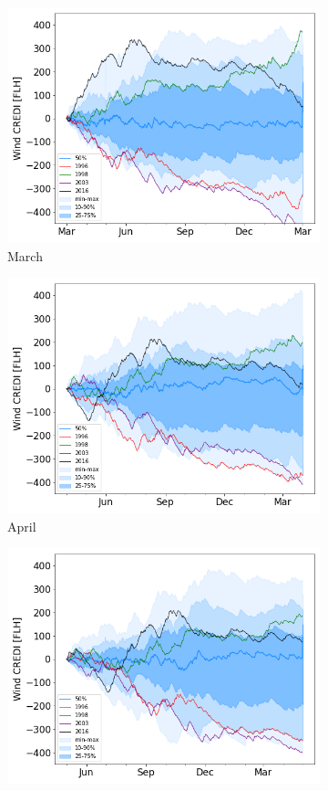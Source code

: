 \documentclass[a4paper,11pt]{extarticle}
\begin{document}
\begin{figure}[b]
\begin{subfigure}[t]{0.32\linewidth}
    \includegraphics[width=\linewidth]{Fig_CUMSUM_YearStart_March}
    \caption{March }
\end{subfigure}
\begin{subfigure}[t]{0.32\linewidth}
    \includegraphics[width=\linewidth]{Fig_CUMSUM_YearStart_April}
    \caption{April }
\end{subfigure}
\begin{subfigure}[t]{0.32\linewidth}
    \includegraphics[width=\linewidth]{Fig_CUMSUM_YearStart_May}

\end{subfigure}
\end{figure}
\end{document}

